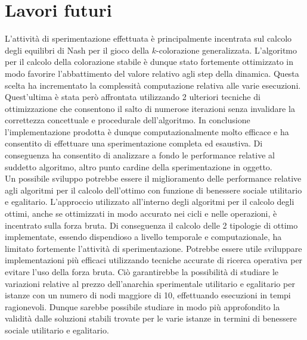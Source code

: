 \section{Lavori futuri}
\justify
L'attività di sperimentazione effettuata è principalmente incentrata sul calcolo degli equilibri di Nash per il gioco della $k$-colorazione generalizzata. L'algoritmo per il calcolo della colorazione stabile è dunque stato fortemente ottimizzato in modo favorire l'abbattimento del valore relativo agli step della dinamica. Questa scelta ha incrementato la complessità computazione relativa alle varie esecuzioni. Quest'ultima è stata però affrontata utilizzando 2 ulteriori tecniche di ottimizzazione che consentono il salto di numerose iterazioni senza invalidare la correttezza concettuale e procedurale dell'algoritmo. In conclusione l'implementazione prodotta è dunque computazionalmente molto efficace e ha consentito di effettuare una sperimentazione completa ed esaustiva. Di conseguenza ha consentito di analizzare a fondo le performance relative al suddetto algoritmo, altro punto cardine della sperimentazione in oggetto.\\
Un possibile sviluppo potrebbe essere il miglioramento delle performance relative agli algoritmi per il calcolo dell'ottimo con funzione di benessere sociale utilitario e egalitario. L'approccio utilizzato all'interno degli algoritmi per il calcolo degli ottimi, anche se ottimizzati in modo accurato nei cicli e nelle operazioni, è incentrato sulla forza bruta. Di conseguenza il calcolo delle 2 tipologie di ottimo implementate, essendo dispendioso a livello temporale e computazionale, ha limitato fortemente l'attività di sperimentazione. Potrebbe essere utile sviluppare implementazioni più efficaci utilizzando tecniche accurate di ricerca operativa per evitare l'uso della forza bruta. Ciò garantirebbe la possibilità di studiare le variazioni relative al prezzo dell'anarchia sperimentale utilitario e egalitario per istanze con un numero di nodi maggiore di 10, effettuando esecuzioni in tempi ragionevoli. Dunque sarebbe possibile studiare in modo più approfondito la validità dalle soluzioni stabili trovate per le varie istanze in termini di benessere sociale utilitario e egalitario.